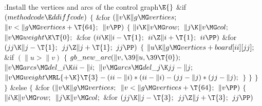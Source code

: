 \B{}:Install the vertices and arcs of the control graph\X${}\E{}$\6
\&{if} ${}(\\{methodcode}\E\\{ddiffcode}){}$\5
${}\{{}$\1\6
\&{for} ${}(\|v\K\|g\MG\\{vertices};{}$ ${}\|v<\|g\MG\\{vertices}+\T{64};{}$
${}\|v\PP){}$\5
${}\{{}$\1\6
${}\|i\K\|v\MG\\{row};{}$\6
${}\|j\K\|v\MG\\{col};{}$\6
${}\|v\MG\\{weight}\K\T{0};{}$\6
\&{for} ${}(\\{ii}\K\|i-\T{1};{}$ ${}\\{ii}\Z\|i+\T{1};{}$ ${}\\{ii}\PP){}$\1\6
\&{for} ${}(\\{jj}\K\|j-\T{1};{}$ ${}\\{jj}\Z\|j+\T{1};{}$ ${}\\{jj}\PP){}$\5
${}\{{}$\1\6
${}\|u\K\|g\MG\\{vertices}+\\{board}[\\{ii}][\\{jj}];{}$\6
\&{if} ${}(\|u>\|v){}$\5
${}\{{}$\1\6
${}\\{gb\_new\_arc}(\|v,\39\|u,\39\T{0});{}$\6
${}\|v\MG\\{arcs}\MG\\{del\_i}\K\\{ii}-\|i;{}$\6
${}\|v\MG\\{arcs}\MG\\{del\_j}\K\\{jj}-\|j;{}$\6
${}\|v\MG\\{weight}\MRL{+{\K}}\T{3}-(\\{ii}-\|i)*(\\{ii}-\|i)-(\\{jj}-\|j)*(%
\\{jj}-\|j);{}$\6
\4${}\}{}$\2\6
\4${}\}{}$\2\2\6
\4${}\}{}$\2\6
\4${}\}{}$\2\6
\&{else}\5
${}\{{}$\1\6
\&{for} ${}(\|v\K\|g\MG\\{vertices};{}$ ${}\|v<\|g\MG\\{vertices}+\T{64};{}$
${}\|v\PP){}$\5
${}\{{}$\1\6
${}\|i\K\|v\MG\\{row};{}$\6
${}\|j\K\|v\MG\\{col};{}$\6
\&{for} ${}(\\{jj}\K\|j-\T{3};{}$ ${}\\{jj}\Z\|j+\T{3};{}$ ${}\\{jj}\PP){}$\5
